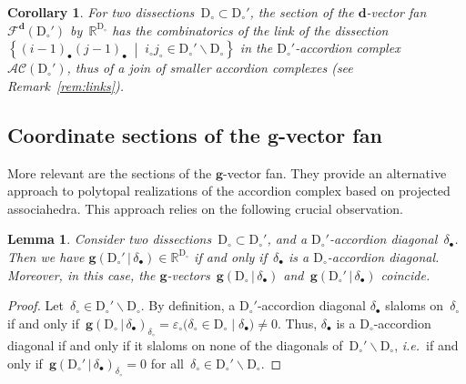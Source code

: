 \documentclass{amsart}
\newtheorem{corollary}[theorem]{Corollary}
\newtheorem{lemma}[theorem]{Lemma}
\theoremstyle{definition}
\newcommand{\R}{\mathbb{R}} %
\renewcommand{\b}[1]{\mathbf{#1}} %
\newcommand{\set}[2]{\left\{ #1 \;\middle|\; #2 \right\}} %
\newcommand{\ssm}{\smallsetminus} %
\newcommand{\ie}{\textit{i.e.}~} %
\newcommand{\accordionComplex}{\mathcal{AC}} %
\newcommand{\dissection}{\mathrm{D}} %
\newcommand{\signcirc}[3]{{\varepsilon_\circ \big( {#1} \in {#2} \;|\; {#3} \big)}} %
\newcommand{\gvector}[2]{\mathbf{g}(#1 \,|\, #2)} %
\newcommand{\dvectorFan}{\mathcal{F}^\mathbf{d}} %
\begin{document}
\begin{corollary}
For two dissections~$\dissection_\circ \subset \dissection_\circ'$, the section of the $\b{d}$-vector fan~$\dvectorFan(\dissection_\circ')$ by~$\R^{\dissection_\circ}$ has the combinatorics of the link of the dissection~$\set{(i-1)_\bullet (j-1)_\bullet}{i_\circ j_\circ \in \dissection_\circ' \ssm \dissection_\circ}$ in the \mbox{$\dissection_\circ'$-accordion} complex~$\accordionComplex(\dissection_\circ')$, thus of a join of smaller accordion complexes (see Remark~\ref{rem:links}).
\end{corollary}

\subsection{Coordinate sections of the $\b{g}$-vector fan}
\label{subsec:sectiongvectors}

More relevant are the sections of the $\b{g}$-vector fan. They provide an alternative approach to polytopal realizations of the accordion complex based on projected associahedra. This approach relies on the following crucial observation.

\begin{lemma}
\label{lem:deleteDiagonals}
Consider two dissections~$\dissection_\circ \subset \dissection_\circ'$, and a $\dissection_\circ'$-accordion diagonal~$\delta_\bullet$. Then we have $\gvector{\dissection_\circ'}{\delta_\bullet} \in \R^{\dissection_\circ}$ if and only if~$\delta_\bullet$ is a $\dissection_\circ$-accordion diagonal. Moreover, in this case, the \mbox{$\b{g}$-vectors}~$\gvector{\dissection_\circ}{\delta_\bullet}$ and~$\gvector{\dissection_\circ'}{\delta_\bullet}$ coincide.
\end{lemma}

\begin{proof}
Let~$\delta_\circ \in \dissection_\circ' \ssm \dissection_\circ$. By definition, a $\dissection_\circ'$-accordion diagonal $\delta_\bullet$ slaloms on~$\delta_\circ$ if and only if~$\gvector{\dissection_\circ}{\delta_\bullet}_{\delta_\circ} = \signcirc{\delta_\circ}{\dissection_\circ}{\delta_\bullet} \ne 0$. Thus, $\delta_\bullet$ is a $\dissection_\circ$-accordion diagonal if and only if it slaloms on none of the diagonals of~$\dissection_\circ' \ssm \dissection_\circ$, \ie if and only if~$\gvector{\dissection_\circ'}{\delta_\bullet}_{\delta_\circ} = 0$ for all~$\delta_\circ \in \dissection_\circ' \ssm \dissection_\circ$.
\end{proof}
\end{document}
